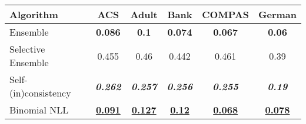 \begin{tabular} {|l|c|c|c|c|c|}
\hline
\textbf{Algorithm} & \textbf{ACS} & \textbf{Adult} & \textbf{Bank} & \textbf{COMPAS} & \textbf{German} \\ \hline
Ensemble & \textbf{0.086} & \textbf{0.1} & \textbf{0.074} & \textbf{0.067} & \textbf{0.06} \\ \hline 
Selective Ensemble & 0.455 & 0.46 & 0.442 & 0.461 & 0.39 \\ \hline 
Self-(in)consistency & \textbf{\textit{0.262}} & \textbf{\textit{0.257}} & \textbf{\textit{0.256}} & \textbf{\textit{0.255}} & \textbf{\textit{0.19}} \\ \hline 
Binomial NLL & \textbf{\underline{0.091}} & \textbf{\underline{0.127}} & \textbf{\underline{0.12}} & \textbf{\underline{0.068}} & \textbf{\underline{0.078}} \\ \hline 
\end{tabular}